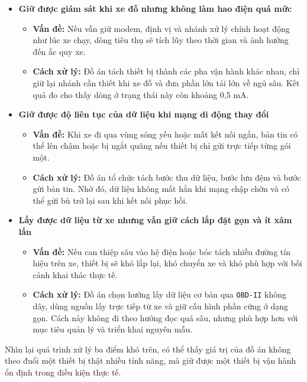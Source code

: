 \documentclass[a4paper]{extarticle}
\providecommand{\tightlist}{%
  \setlength{\itemsep}{0pt}\setlength{\parskip}{0pt}}
\begin{document}
\begin{itemize}
\tightlist
\item
  \textbf{Giữ được giám sát khi xe đỗ nhưng không làm hao điện quá mức}

  \begin{itemize}
  \tightlist
  \item
    \textbf{Vấn đề:} Nếu vẫn giữ modem, định vị và nhánh xử lý chính hoạt động như lúc xe chạy, dòng tiêu thụ sẽ tích lũy theo thời gian và ảnh hưởng đến ắc quy xe.
  \item
    \textbf{Cách xử lý:} Đồ án tách thiết bị thành các pha vận hành khác nhau, chỉ giữ lại nhánh cần thiết khi xe đỗ và đưa phần lớn tải lớn về ngủ sâu. Kết quả đo cho thấy dòng ở trạng thái này còn khoảng 0,5 mA.
  \end{itemize}
\item
  \textbf{Giữ được độ liên tục của dữ liệu khi mạng di động thay đổi}

  \begin{itemize}
  \tightlist
  \item
    \textbf{Vấn đề:} Khi xe đi qua vùng sóng yếu hoặc mất kết nối ngắn, bản tin có thể lên chậm hoặc bị ngắt quãng nếu thiết bị chỉ gửi trực tiếp từng gói một.
  \item
    \textbf{Cách xử lý:} Đồ án tổ chức tách bước thu dữ liệu, bước lưu đệm và bước gửi bản tin. Nhờ đó, dữ liệu không mất hẳn khi mạng chập chờn và có thể gửi bù trở lại sau khi kết nối phục hồi.
  \end{itemize}
\item
  \textbf{Lấy được dữ liệu từ xe nhưng vẫn giữ cách lắp đặt gọn và ít xâm lấn}

  \begin{itemize}
  \tightlist
  \item
    \textbf{Vấn đề:} Nếu can thiệp sâu vào hệ điện hoặc bóc tách nhiều đường tín hiệu trên xe, thiết bị sẽ khó lắp lại, khó chuyển xe và khó phù hợp với bối cảnh khai thác thực tế.
  \item
    \textbf{Cách xử lý:} Đồ án chọn hướng lấy dữ liệu cơ bản qua \texttt{OBD-II} không dây, dùng nguồn lấy trực tiếp từ xe và giữ cấu hình phần cứng ở dạng gọn. Cách này không đi theo hướng đọc quá sâu, nhưng phù hợp hơn với mục tiêu quản lý và triển khai nguyên mẫu.
  \end{itemize}
\end{itemize}

Nhìn lại quá trình xử lý ba điểm khó trên, có thể thấy giá trị của đồ án không theo đuổi một thiết bị thật nhiều tính năng, mà giữ được một thiết bị vận hành ổn định trong điều kiện thực tế.
\end{document}

